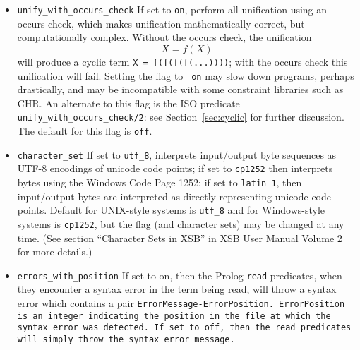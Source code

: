 \begin{description}
\begin{itemize}
\item {\tt unify\_with\_occurs\_check} If set to {\tt on}, perform all
  unification using an occurs check, which makes unification
  mathematically correct, but computationally complex.  Without the occurs
  check, the unification 
\[
   X = f(X)
\]
  will produce a cyclic term {\tt X = f(f(f(f(...))))}; with the
  occurs check this unification will fail.  Setting the flag to {\tt
    on} may slow down programs, perhaps drastically, and may be
  incompatible with some constraint libraries such as CHR.  An
  alternate to this flag is the ISO predicate {\tt
    unify\_with\_occurs\_check/2}: see Section~\ref{sec:cyclic} for
    further discussion.  The default for this flag is {\tt off}.
%
\item {\tt character\_set} If set to {\tt utf\_8}, interprets
input/output byte sequences as UTF-8 encodings of unicode code points;
if set to {\tt cp1252} then interprets bytes using the Windows Code
Page 1252; if set to {\tt latin\_1}, then input/output bytes are
interpreted as directly representing unicode code points.  Default for
UNIX-style systems is {\tt utf\_8} and for Windows-style systems is
{\tt cp1252}, but the flag (and character sets) may be changed at any
time.  (See section ``Character Sets in XSB'' in XSB User Manual
Volume 2 for more details.)
%
\item {\tt errors\_with\_position} If set to on, then the Prolog
{\tt read} predicates, when they encounter a syntax error in the term
being read, will throw a syntax error which contains a pair
\tt{ErrorMessage-ErrorPosition}.  {\tt ErrorPosition} is an integer
indicating the position in the file at which the syntax error was
detected. If set to off, then the read predicates will simply throw
the syntax error message.


\end{itemize}
\end{description}
